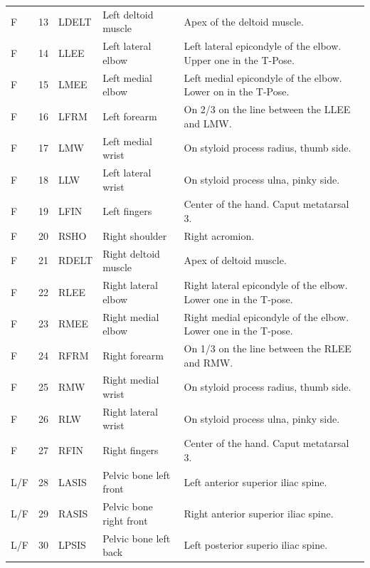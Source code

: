 \documentclass[10pt,a4paper,twocolumn]{article}
\begin{document}
\begin{table}
\begin{tabular}{lrlll}
    F   & 13 & LDELT & Left deltoid muscle                   & Apex of the deltoid muscle. \\
    F   & 14 & LLEE  & Left lateral elbow                    & Left lateral epicondyle of the elbow. Upper one in the T-Pose. \\
    F   & 15 & LMEE  & Left medial elbow                     & Left medial epicondyle of the elbow. Lower on in the T-Pose. \\
    F   & 16 & LFRM  & Left forearm                          & On 2/3 on the line between the LLEE and LMW. \\
    F   & 17 & LMW   & Left medial wrist                     & On styloid process radius, thumb side. \\
    F   & 18 & LLW   & Left lateral wrist                    & On styloid process ulna, pinky side. \\
    F   & 19 & LFIN  & Left fingers                          & Center of the hand. Caput metatarsal 3. \\
    F   & 20 & RSHO  & Right shoulder                        & Right acromion. \\
    F   & 21 & RDELT & Right deltoid muscle                  & Apex of deltoid muscle. \\
    F   & 22 & RLEE  & Right lateral elbow                   & Right lateral epicondyle of the elbow. Lower one in the T-pose. \\
    F   & 23 & RMEE  & Right medial elbow                    & Right medial epicondyle of the elbow. Lower one in the T-pose. \\
    F   & 24 & RFRM  & Right forearm                         & On 1/3 on the line between the RLEE and RMW. \\
    F   & 25 & RMW   & Right medial wrist                    & On styloid process radius, thumb side. \\
    F   & 26 & RLW   & Right lateral wrist                   & On styloid process ulna, pinky side. \\
    F   & 27 & RFIN  & Right fingers                         & Center of the hand. Caput metatarsal 3. \\
    L/F & 28 & LASIS & Pelvic bone left front                & Left anterior superior iliac spine. \\
    L/F & 29 & RASIS & Pelvic bone right front               & Right anterior superior iliac spine. \\
    L/F & 30 & LPSIS & Pelvic bone left back                 & Left posterior superio iliac spine. \\

\end{tabular}
\end{table}
\end{document}
